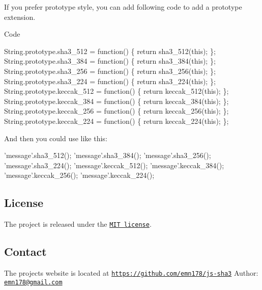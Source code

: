If you prefer prototype style, you can add following code to add a prototype extension.

Code 
\begin{DoxyCode}
String.prototype.sha3\_512 = function() \{
  return sha3\_512(this);
\};
String.prototype.sha3\_384 = function() \{
  return sha3\_384(this);
\};
String.prototype.sha3\_256 = function() \{
  return sha3\_256(this);
\};
String.prototype.sha3\_224 = function() \{
  return sha3\_224(this);
\};
String.prototype.keccak\_512 = function() \{
  return keccak\_512(this);
\};
String.prototype.keccak\_384 = function() \{
  return keccak\_384(this);
\};
String.prototype.keccak\_256 = function() \{
  return keccak\_256(this);
\};
String.prototype.keccak\_224 = function() \{
  return keccak\_224(this);
\};
\end{DoxyCode}
 And then you could use like this\+: 
\begin{DoxyCode}
'message'.sha3\_512();
'message'.sha3\_384();
'message'.sha3\_256();
'message'.sha3\_224();
'message'.keccak\_512();
'message'.keccak\_384();
'message'.keccak\_256();
'message'.keccak\_224();
\end{DoxyCode}
 \subsection*{License}

The project is released under the \href{http://www.opensource.org/licenses/MIT}{\tt M\+IT license}.

\subsection*{Contact}

The project\textquotesingle{}s website is located at \href{https://github.com/emn178/js-sha3}{\tt https\+://github.\+com/emn178/js-\/sha3} Author\+: \href{mailto:emn178@gmail.com}{\tt emn178@gmail.\+com} 